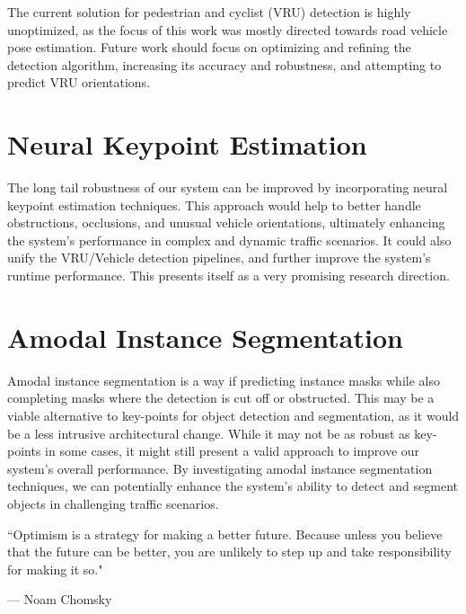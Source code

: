 The current solution for pedestrian and cyclist (VRU) detection is highly unoptimized, as the focus of this work was mostly directed towards road vehicle pose estimation.
Future work should focus on optimizing and refining the detection algorithm, increasing its accuracy and robustness, and attempting to predict VRU orientations.

\section{Neural Keypoint Estimation}
\label{sec:neuralkeypoints}

The long tail robustness of our system can be improved by incorporating neural keypoint estimation techniques.
This approach would help to better handle obstructions, occlusions, and unusual vehicle orientations, ultimately enhancing the system's performance in complex and dynamic traffic scenarios.
It could also unify the VRU/Vehicle detection pipelines, and further improve the system's runtime performance.
This presents itself as a very promising research direction.

\section{Amodal Instance Segmentation}
\label{sec:amodal}

Amodal instance segmentation is a way if predicting instance masks while also completing masks where the detection is cut off or obstructed.
This may be a viable alternative to key-points for object detection and segmentation, as it would be a less intrusive architectural change.
While it may not be as robust as key-points in some cases, it might still present a valid approach to improve our system's overall performance.
By investigating amodal instance segmentation techniques, we can potentially enhance the system's ability to detect and segment objects in challenging traffic scenarios.

\par\vspace*{\fill}
\epigraph{``Optimism is a strategy for making a better future. Because unless you believe that the future can be better, you are unlikely to step up and take responsibility for making it so."}{--- \textup{Noam Chomsky}}
